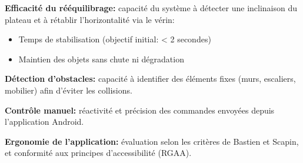 \documentclass[12pt,a4paper]{article}
\begin{document}
\textbf{Efficacité du rééquilibrage:} capacité du système à détecter une inclinaison du plateau et à rétablir l’horizontalité via le vérin:
\begin{itemize}
    \item Temps de stabilisation (objectif initial: < 2 secondes)
    \item Maintien des objets sans chute ni dégradation
\end{itemize}

\textbf{Détection d’obstacles:} capacité à identifier des éléments fixes (murs, escaliers, mobilier) afin d’éviter les collisions.

\textbf{Contrôle manuel:} réactivité et précision des commandes envoyées depuis l’application Android.

\textbf{Ergonomie de l’application:} évaluation selon les critères de Bastien et Scapin, et conformité aux principes d’accessibilité (RGAA).


\renewcommand{\arraystretch}{1.3}
\setlength{\tabcolsep}{6pt}
\end{document}
